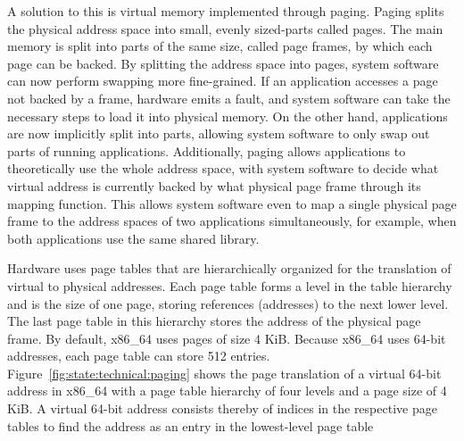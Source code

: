 A solution to this is virtual memory implemented through
paging.\cite{tanenbaum2015modern} Paging splits the physical address space into
small, evenly sized-parts called pages. The main memory is split into parts of
the same size, called page frames, by which each page can be backed. By
splitting the address space into pages, system software can now perform swapping
more fine-grained. If an application accesses a page not backed by a frame,
hardware emits a fault, and system software can take the necessary steps to load
it into physical memory. On the other hand, applications are now implicitly
split into parts, allowing system software to only swap out parts of running
applications. Additionally, paging allows applications to theoretically use the
whole address space, with system software to decide what virtual address is
currently backed by what physical page frame through its mapping function. This
allows system software even to map a single physical page frame to the address
spaces of two applications simultaneously, for example, when both applications
use the same shared library.

Hardware uses page tables that are hierarchically organized for the translation
of virtual to physical addresses. Each page table forms a level in the table
hierarchy and is the size of one page, storing references (addresses) to the
next lower level. The last page table in this hierarchy stores the address of
the physical page frame. By default, x86\_64 uses pages of size 4 KiB. Because
x86\_64 uses 64-bit addresses, each page table can store 512 entries.
Figure~\ref{fig:state:technical:paging} shows the page translation of a virtual
64-bit address in x86\_64 with a page table hierarchy of four levels and a page
size of 4 KiB. A virtual 64-bit address consists thereby of indices in the
respective page tables to find the address as an entry in the lowest-level page
table\\

